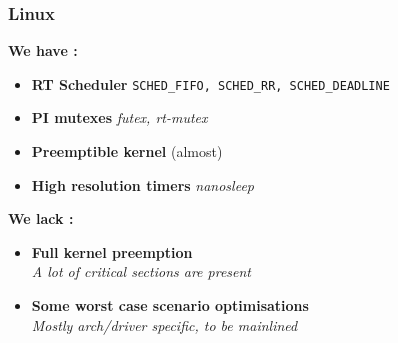 \documentclass{smilebeamer}
\begin{document}
\begin{frame}
	\frametitle{Linux}

	\textbf{We have :}

	\begin{itemize}
		\item \textbf{RT Scheduler} {\small{\texttt{SCHED\_FIFO, SCHED\_RR, SCHED\_DEADLINE}}}
		\item \textbf{PI mutexes} {\small{\textit{futex, rt-mutex}}}
		\item \textbf{Preemptible kernel} (almost)
		\item \textbf{High resolution timers}  {\small{\textit{nanosleep}}}
	\end{itemize}

	\textbf{We lack :}

	\begin{itemize}
		\item \textbf{Full kernel preemption} \\ {\small{\textit{A lot of critical sections are present}}}
		\item \textbf{Some worst case scenario optimisations} \\ {\small{\textit{Mostly arch/driver specific, to be mainlined}}}
	\end{itemize}
\end{frame}



\end{document}
